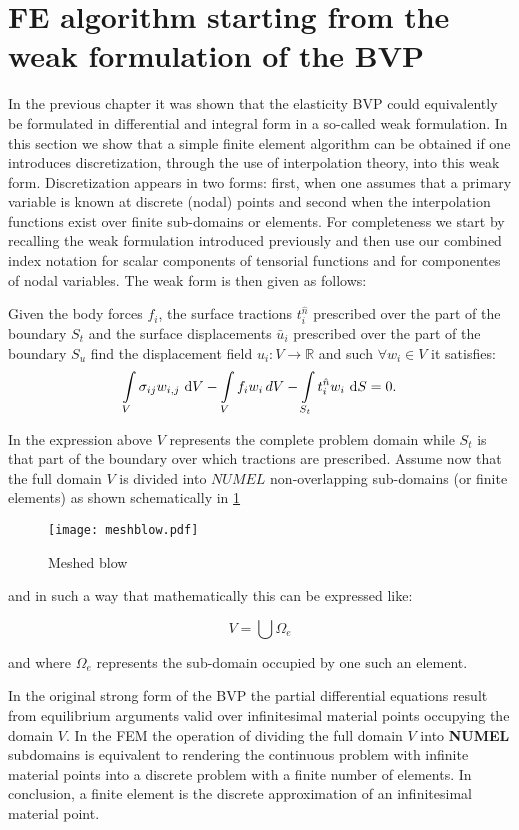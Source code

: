 \section{FE algorithm starting from the weak formulation of the BVP}
In the previous chapter it was shown that the elasticity BVP could equivalently be formulated in differential and integral form in a so-called weak formulation. In this section we show that a simple finite element algorithm can be obtained if one introduces discretization, through the use of interpolation theory, into this weak form. Discretization appears in two forms: first, when one assumes that a primary variable is known at discrete (nodal) points and second when the interpolation functions exist over finite sub-domains or elements. For completeness we start by recalling the weak formulation introduced previously and then use our combined index notation for scalar components of tensorial functions and for componentes of nodal variables. The weak form is then given as follows:

Given the body forces $f_i$, the surface tractions $t_i^{\hat n}$ prescribed over the part of the boundary $S_t$ and the surface displacements ${\bar u_i}$ prescribed over the part of the boundary $S_u$ find the displacement field ${u_i}:V \to \mathbb{R}$ and such $\forall {w_i} \in V$ it satisfies:
\[\int\limits_V \sigma_{ij} w_{i,j}\, \dd{V} - \int\limits_V f_i w_i\, dV  - \int\limits_{S_t} t_i^{\hat n} w_i\, \dd{S} = 0.\]


In the expression above $V$ represents the complete problem domain while $S_t$ is that part of the boundary over which tractions are prescribed. Assume now that the full domain $V$ is divided into $NUMEL$ non-overlapping sub-domains (or finite elements) as shown schematically in \cref{fig:blow2}


\begin{figure}[h]
\centering
\texttt{[image: meshblow.pdf]}
\caption{Meshed blow}
\label{fig:blow2}
\end{figure}


and in such a way that mathematically this can be expressed like:

\[V=\bigcup \Omega _e\]

and where $\Omega _e$ represents the sub-domain occupied by one such an element.

\begin{tcolorbox}
In the original strong form of the BVP the partial differential equations result from equilibrium arguments valid over infinitesimal material points occupying the domain $V$. In the FEM the operation of dividing the full domain $V$ into {\bf NUMEL} subdomains is equivalent to rendering the continuous problem with infinite material points into a discrete problem with a finite number of elements. In conclusion, a finite element is the discrete approximation of an infinitesimal material point.

\end{tcolorbox}


